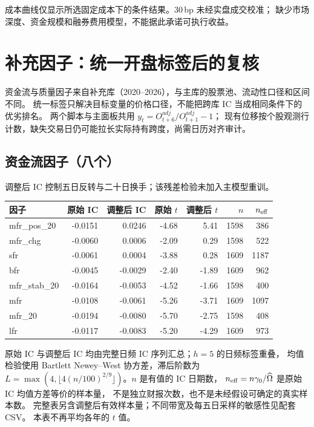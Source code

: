 \documentclass[UTF8,10pt,a4paper]{ctexart}
\begin{document}
\begin{kb}[成本是最后的裁判]
成本曲线仅显示所选固定成本下的条件结果。30\,bp 未经实盘成交校准；
缺少市场深度、资金规模和融券费用模型，不能据此承诺可执行收益。
\end{kb}

\clearpage
\section{补充因子：统一开盘标签后的复核}
资金流与质量因子来自补充库（2020--2026），与主库的股票池、流动性口径和区间不同。
统一标签只解决目标变量的价格口径，不能把跨库 IC 当成相同条件下的优劣排名。
两个脚本与主面板共用 $y_t=O^{adj}_{t+6}/O^{adj}_{t+1}-1$；
现有位移按个股观测行计数，缺失交易日仍可能拉长实际持有跨度，尚需日历对齐审计。

\subsection{资金流因子（八个）}
调整后 IC 控制五日反转与二十日换手；该残差检验未加入主模型重训。
\begin{center}\small
\begin{tabular}{@{}lrrrrrr@{}}
\toprule
因子 & 原始 IC & 调整后 IC & 原始 $t$ & 调整后 $t$ & $n$ & $n_{\rm eff}$ \\
\midrule
mfr\_pos\_20 & -0.0151 & 0.0246 & -4.68 & 5.41 & 1598 & 386 \\
mfr\_chg & -0.0060 & 0.0006 & -2.09 & 0.29 & 1598 & 522 \\
sfr & -0.0061 & 0.0004 & -3.88 & 0.28 & 1609 & 1187 \\
bfr & -0.0045 & -0.0029 & -2.40 & -1.89 & 1609 & 962 \\
mfr\_stab\_20 & -0.0164 & -0.0053 & -4.52 & -1.66 & 1598 & 400 \\
mfr & -0.0108 & -0.0061 & -5.26 & -3.71 & 1609 & 1097 \\
mfr\_20 & -0.0194 & -0.0080 & -5.70 & -2.75 & 1598 & 408 \\
lfr & -0.0117 & -0.0083 & -5.20 & -4.29 & 1609 & 973 \\
\bottomrule
\end{tabular}
\end{center}
原始 IC 与调整后 IC 均由完整日频 IC 序列汇总；$h=5$ 的日频标签重叠，
均值检验使用 Bartlett Newey--West 协方差，滞后阶数为
$L=\max(4,\lfloor4(n/100)^{2/9}\rfloor)$。$n$ 是有值的 IC 日期数，
$n_{\rm eff}=n\gamma_0/\widehat\Omega$ 是原始 IC 均值方差等价的样本量，
不是独立财报次数，也不是未经假设可确定的真实样本数。
完整表另含调整后有效样本量；不同带宽及每五日采样的敏感性见配套 CSV。
本表不再平均各年的 $t$ 值。
\end{document}
